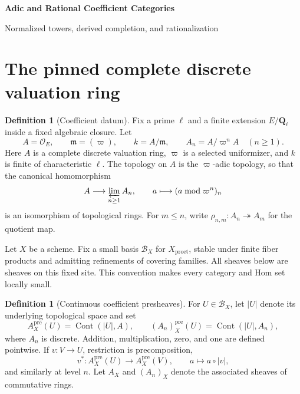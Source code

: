 \documentclass[10pt]{article}
\theoremstyle{definition}
\newtheorem{definition}[theorem]{Definition}
\newcommand{\Ql}{\mathbf Q_\ell}
\begin{document}
\begin{center}
{\large\bfseries Adic and Rational Coefficient Categories\par}
\medskip
{\normalsize Normalized towers, derived completion, and rationalization\par}
\end{center}

\begin{abstract}
This note constructs integral and rational $\ell$-adic coefficient
categories using ordinary abelian and triangulated categories.  Finite
reduction is built
from K-flat complexes, derived completion is built from the derived inverse
limit of a tower, and the equivalence between complete complexes and
normalized finite-level systems is decomposed into its reduction, limit,
unit, counit, and conservativity statements.  Rational coefficients are
then obtained by central localization and Karoubi completion, followed by
coherent transition functors for finite extensions of coefficient fields.
\end{abstract}

\tableofcontents

\section{The pinned complete discrete valuation ring}

\begin{definition}[Coefficient datum]\label{def:coefficient-datum}
Fix a prime $\ell$ and a finite extension $E/\Ql$ inside a fixed algebraic
closure.  Let
\[
 A=\mathcal O_E,\qquad \mathfrak m=(\varpi),\qquad
 k=A/\mathfrak m,\qquad A_n=A/\varpi^nA\quad(n\geq1).
\]
Here $A$ is a complete discrete valuation ring, $\varpi$ is a selected
uniformizer, and $k$ is finite of characteristic $\ell$.  The topology on
$A$ is the $\varpi$-adic topology, so that the canonical homomorphism
\[
 A\longrightarrow\varprojlim_{n\geq1}A_n,\qquad
 a\longmapsto(a\bmod\varpi^n)_n
\]
is an isomorphism of topological rings.  For $m\leq n$, write
$\rho_{n,m}:A_n\twoheadrightarrow A_m$ for the quotient map.
\end{definition}

Let $X$ be a scheme.  Fix a small basis $\mathcal B_X$ for
$X_{\mathrm{proet}}$, stable under finite fiber products and admitting
refinements of covering families.  All sheaves below are sheaves on this
fixed site.  This convention makes every category and Hom set locally
small.

\begin{definition}[Continuous coefficient presheaves]\label{def:coefficient-presheaves}
For $U\in\mathcal B_X$, let $|U|$ denote its underlying topological space
and set
\[
 A_X^{\mathrm{pre}}(U)=\operatorname{Cont}(|U|,A),\qquad
 (A_n)_X^{\mathrm{pre}}(U)=\operatorname{Cont}(|U|,A_n),
\]
where $A_n$ is discrete.  Addition, multiplication, zero, and one are
defined pointwise.  If $v:V\to U$, restriction is precomposition,
\[
 v^*:A_X^{\mathrm{pre}}(U)\longrightarrow A_X^{\mathrm{pre}}(V),
 \qquad a\longmapsto a\circ |v|,
\]
and similarly at level $n$.  Let $A_X$ and $(A_n)_X$ denote the associated
sheaves of commutative rings.
\end{definition}
\end{document}
